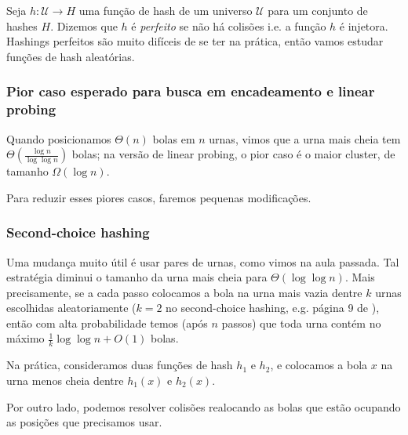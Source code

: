 Seja $h:\mathcal{U}\rightarrow H$ uma função de hash de um universo $\mathcal{U}$ para um conjunto de hashes $H$. Dizemos que $h$ é \emph{perfeito} se não há colisões i.e. a função $h$ é injetora. Hashings perfeitos são muito difíceis de se ter na prática, então vamos estudar funções de hash aleatórias.

\subsubsection{Pior caso esperado para busca em encadeamento e linear probing} Quando posicionamos $\Theta(n)$ bolas em $n$ urnas, vimos que a urna mais cheia tem $\Theta(\frac{\log n}{\log \log n})$ bolas; na versão de linear probing, o pior caso é o maior cluster, de tamanho $\Omega(\log n)$.

Para reduzir esses piores casos, faremos pequenas modificações.

\subsubsection{Second-choice hashing} Uma mudança muito útil é usar pares de urnas, como vimos na aula passada. Tal estratégia diminui o tamanho da urna mais cheia para $\Theta(\log\log n)$. Mais precisamente, se a cada passo colocamos a bola na urna mais vazia dentre $k$ urnas escolhidas aleatoriamente ($k=2$ no second-choice hashing, e.g. página 9 de \cite{1}), então com alta probabilidade temos (após $n$ passos) que toda urna contém no máximo $\frac{1}{k}\log\log n + O(1)$ bolas. 

Na prática, consideramos duas funções de hash $h_1$ e $h_2$, e colocamos a bola $x$ na urna menos cheia dentre $h_1(x)$ e $h_2(x)$.

Por outro lado, podemos resolver colisões realocando as bolas que estão ocupando as posições que precisamos usar.

